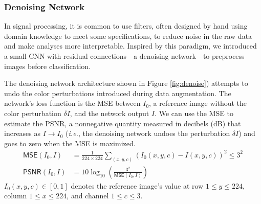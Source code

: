 \documentclass[justified]{article}
\begin{document}
  \subsubsection{Denoising Network}

  In signal processing, it is common to use filters, often designed by hand using domain knowledge to meet some specifications, to reduce noise in the raw data and make analyses more interpretable.
  Inspired by this paradigm, we introduced a small CNN with residual connections---a denoising network---to preprocess images before classification.

  The denoising network architecture shown in Figure \ref{fig:denoise}) attempts to undo the color perturbations introduced during data augmentation.
  The network's loss function is the MSE between $I_0$, a reference image without the color perturbation $\delta I$, and the network output $I$.
  We can use the MSE to estimate the PSNR, a nonnegative quantity measured in decibels (dB) that increases as $I \to I_0$ (\textit{i.e.}, the denoising network undoes the perturbation $\delta I$) and goes to zero when the MSE is maximized.
  \begin{equation}
    \begin{split}
      \mathsf{MSE}(I_0, I) &= \frac{1}{224 \times 224} \sum_{(x, y, c)} \left(I_0(x, y, c) - I(x, y, c)\right)^2 \leq 3^2 \\
      \mathsf{PSNR}(I_0, I) &= 10 \log_{10} \left(\frac{3^2}{\mathsf{MSE}(I_0, I)}\right)
    \end{split}
  \end{equation}
  $I_0(x, y, c) \in [0, 1]$ denotes the reference image's value at row $1 \leq y \leq 224$, column $1 \leq x \leq 224$, and channel $1 \leq c \leq 3$.
\end{document}
